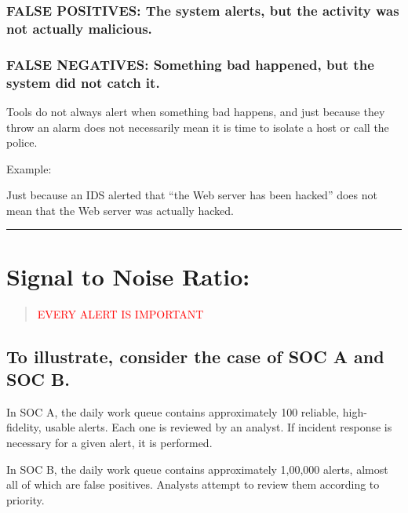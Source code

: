 \documentclass[british]{article}
\begin{document}
\subsubsection{FALSE POSITIVES: The system alerts, but the activity was not actually
	malicious.}

\subsubsection{FALSE NEGATIVES: Something bad happened, but the system did not catch
	it.}

Tools do not always alert when something bad happens, and just because
they throw an alarm does not necessarily mean it is time to isolate
a host or call the police.

Example:

Just because an IDS alerted that ``the Web server has been hacked''
does not mean that the Web server was actually hacked.

\rule[0.5ex]{0.75\columnwidth}{1pt}

\section{Signal to Noise Ratio:}
\begin{quotation}
	\noindent \begin{center}
		\textcolor{red}{\LARGE{}EVERY ALERT IS IMPORTANT}{\LARGE\par}
		\par\end{center}
	\begin{center}

		\par\end{center}
\end{quotation}

\subsection{To illustrate, consider the case of SOC A and SOC B.}

In SOC A, the daily work queue contains approximately 100 reliable,
high-fidelity, usable alerts. Each one is reviewed by an analyst.
If incident response is necessary for a given alert, it is performed.

In SOC B, the daily work queue contains approximately 1,00,000 alerts,
almost all of which are false positives. Analysts attempt to review
them according to priority.
\end{document}

